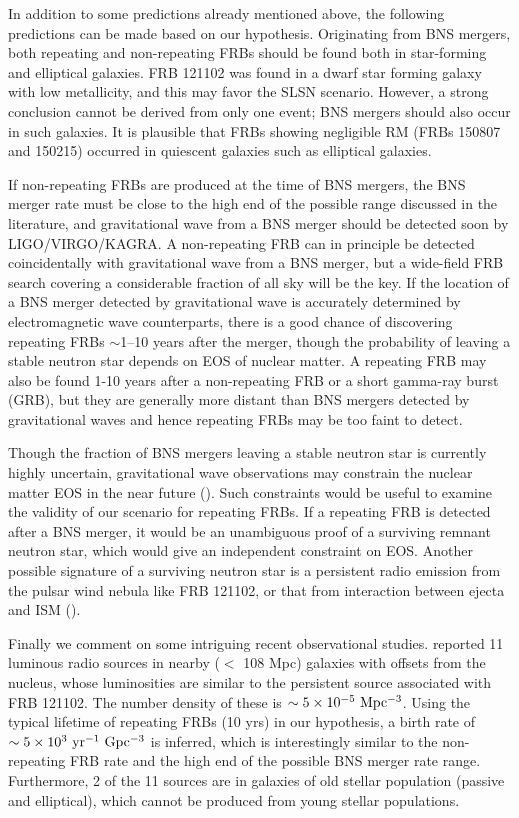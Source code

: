 \documentclass[]{pasj01}
\begin{document}
In addition to some predictions already mentioned above, the following
predictions can be made based on our hypothesis.  Originating from BNS
mergers, both repeating and non-repeating FRBs should be found both in
star-forming and elliptical galaxies.  FRB 121102 was found in a dwarf
star forming galaxy with low metallicity, and this may favor the SLSN
scenario. However, a strong conclusion cannot be derived from only one
event; BNS mergers should also occur in such galaxies.  It is
plausible that FRBs showing negligible RM (FRBs 150807 and 150215)
occurred in quiescent galaxies such as elliptical galaxies.

If non-repeating FRBs are produced at the time of BNS mergers, the BNS
merger rate must be close to the high end of the possible range
discussed in the literature, and gravitational wave from a BNS merger
should be detected soon by LIGO/VIRGO/KAGRA. A non-repeating FRB can
in principle be detected coincidentally with gravitational wave from a
BNS merger, but a wide-field FRB search covering a considerable
fraction of all sky will be the key. If the location of a BNS merger
detected by gravitational wave is accurately determined by
electromagnetic wave counterparts, there is a good chance of
discovering repeating FRBs $\sim$1--10 years after the merger, though
the probability of leaving a stable neutron star depends on EOS of
nuclear matter.  A repeating FRB may also be found 1-10 years after a
non-repeating FRB or a short gamma-ray burst (GRB), but they are
generally more distant than BNS mergers detected by gravitational
waves and hence repeating FRBs may be too faint to detect.

Though the fraction of BNS mergers leaving a stable neutron star is
currently highly uncertain, gravitational wave observations may
constrain the nuclear matter EOS in the near future (\cite{Lattimer&Prakash2007}).  Such constraints would
be useful to examine the validity of our scenario for repeating FRBs.
If a repeating FRB is detected after a BNS merger, it would be an
unambiguous proof of a surviving remnant neutron star, which would
give an independent constraint on EOS.  Another possible signature of
a surviving neutron star is a persistent radio emission from the
pulsar wind nebula like FRB 121102, or that from interaction between
ejecta and ISM (\cite{Horesh2016}).

Finally we comment on some intriguing recent observational studies.
\citet{Ofek2017} reported 11 luminous radio sources in nearby ($<$ 108
Mpc) galaxies with offsets from the nucleus, whose luminosities are
similar to the persistent source associated with FRB 121102. The
number density of these is $\sim 5\times10^{-5} \ {\rm
  Mpc^{-3}}$. Using the typical lifetime of repeating FRBs (10 yrs) in
our hypothesis, a birth rate of $\sim 5\times10^{3} \ {\rm yr^{-1}
  \ Gpc^{-3}}$ is inferred, which is interestingly similar to the
non-repeating FRB rate and the high end of the possible BNS merger
rate range. Furthermore, 2 of the 11 sources are in galaxies of old
stellar population (passive and elliptical), which cannot be produced
from young stellar populations.
\end{document}
